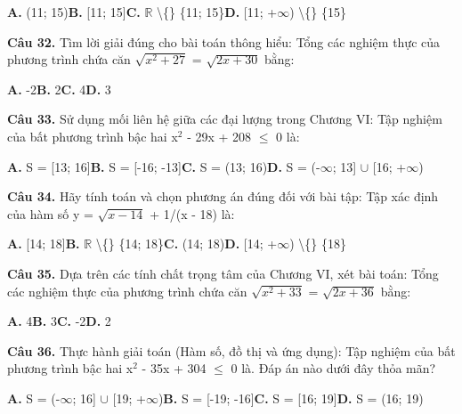 \documentclass[11pt,a4paper]{article}
\begin{document}
\hspace*{1.5em}\textbf{A.} (11; 15)\quad\quad \textbf{B.} [11; 15]\quad\quad \textbf{C.} $\mathbb{R}$ \textbackslash\{\} \{11; 15\}\quad\quad \textbf{D.} [11; +$\infty$) \textbackslash\{\} \{15\}\par\vspace{2pt}
\textbf{\color{primary} Câu 32.} Tìm lời giải đúng cho bài toán thông hiểu: Tổng các nghiệm thực của phương trình chứa căn $\sqrt{x^2 + 27}$ = $\sqrt{2x + 30}$ bằng:\par
\hspace*{1.5em}\textbf{A.} -2\quad\quad \textbf{B.} 2\quad\quad \textbf{C.} 4\quad\quad \textbf{D.} 3\par\vspace{2pt}
\textbf{\color{primary} Câu 33.} Sử dụng mối liên hệ giữa các đại lượng trong Chương VI: Tập nghiệm của bất phương trình bậc hai x$^2$ - 29x + 208 $\le$ 0 là:\par
\hspace*{1.5em}\textbf{A.} S = [13; 16]\quad\quad \textbf{B.} S = [-16; -13]\quad\quad \textbf{C.} S = (13; 16)\quad\quad \textbf{D.} S = (-$\infty$; 13] $\cup$ [16; +$\infty$)\par\vspace{2pt}
\textbf{\color{primary} Câu 34.} Hãy tính toán và chọn phương án đúng đối với bài tập: Tập xác định của hàm số y = $\sqrt{x - 14}$ + 1/(x - 18) là:\par
\hspace*{1.5em}\textbf{A.} [14; 18]\quad\quad \textbf{B.} $\mathbb{R}$ \textbackslash\{\} \{14; 18\}\quad\quad \textbf{C.} (14; 18)\quad\quad \textbf{D.} [14; +$\infty$) \textbackslash\{\} \{18\}\par\vspace{2pt}
\textbf{\color{primary} Câu 35.} Dựa trên các tính chất trọng tâm của Chương VI, xét bài toán: Tổng các nghiệm thực của phương trình chứa căn $\sqrt{x^2 + 33}$ = $\sqrt{2x + 36}$ bằng:\par
\hspace*{1.5em}\textbf{A.} 4\quad\quad \textbf{B.} 3\quad\quad \textbf{C.} -2\quad\quad \textbf{D.} 2\par\vspace{2pt}
\textbf{\color{primary} Câu 36.} Thực hành giải toán (Hàm số, đồ thị và ứng dụng): Tập nghiệm của bất phương trình bậc hai x$^2$ - 35x + 304 $\le$ 0 là. Đáp án nào dưới đây thỏa mãn?\par
\hspace*{1.5em}\textbf{A.} S = (-$\infty$; 16] $\cup$ [19; +$\infty$)\quad\quad \textbf{B.} S = [-19; -16]\quad\quad \textbf{C.} S = [16; 19]\quad\quad \textbf{D.} S = (16; 19)\par\vspace{2pt}
\end{document}
